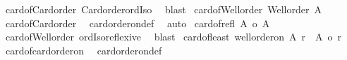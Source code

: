 \begin{isabellebody}
%
\isadelimproof
%
\endisadelimproof
%
\isatagproof
{}\isamarkupfalse%
\ card{\isacharunderscore}{\kern0pt}of{\isacharunderscore}{\kern0pt}Card{\isacharunderscore}{\kern0pt}order\ Card{\isacharunderscore}{\kern0pt}order{\isacharunderscore}{\kern0pt}ordIso\ \isamarkupfalse%
\ blast%
\endisatagproof
{\isafoldproof}%
%
\isadelimproof
\isanewline
%
\endisadelimproof
\isanewline
{}\isamarkupfalse%
\ card{\isacharunderscore}{\kern0pt}of{\isacharunderscore}{\kern0pt}Well{\isacharunderscore}{\kern0pt}order{\isacharcolon}{\kern0pt}\ {\isachardoublequoteopen}Well{\isacharunderscore}{\kern0pt}order\ {\isacharbar}{\kern0pt}A{\isacharbar}{\kern0pt}{\isachardoublequoteclose}\isanewline
%
\isadelimproof
%
\endisadelimproof
%
\isatagproof
{}\isamarkupfalse%
\ card{\isacharunderscore}{\kern0pt}of{\isacharunderscore}{\kern0pt}Card{\isacharunderscore}{\kern0pt}order\ \isamarkupfalse%
\ card{\isacharunderscore}{\kern0pt}order{\isacharunderscore}{\kern0pt}on{\isacharunderscore}{\kern0pt}def\ \isamarkupfalse%
\ auto%
\endisatagproof
{\isafoldproof}%
%
\isadelimproof
\isanewline
%
\endisadelimproof
\isanewline
{}\isamarkupfalse%
\ card{\isacharunderscore}{\kern0pt}of{\isacharunderscore}{\kern0pt}refl{\isacharcolon}{\kern0pt}\ {\isachardoublequoteopen}{\isacharbar}{\kern0pt}A{\isacharbar}{\kern0pt}\ {\isacharequal}{\kern0pt}o\ {\isacharbar}{\kern0pt}A{\isacharbar}{\kern0pt}{\isachardoublequoteclose}\isanewline
%
\isadelimproof
%
\endisadelimproof
%
\isatagproof
{}\isamarkupfalse%
\ card{\isacharunderscore}{\kern0pt}of{\isacharunderscore}{\kern0pt}Well{\isacharunderscore}{\kern0pt}order\ ordIso{\isacharunderscore}{\kern0pt}reflexive\ \isamarkupfalse%
\ blast%
\endisatagproof
{\isafoldproof}%
%
\isadelimproof
\isanewline
%
\endisadelimproof
\isanewline
{}\isamarkupfalse%
\ card{\isacharunderscore}{\kern0pt}of{\isacharunderscore}{\kern0pt}least{\isacharcolon}{\kern0pt}\ {\isachardoublequoteopen}well{\isacharunderscore}{\kern0pt}order{\isacharunderscore}{\kern0pt}on\ A\ r\ {\isasymLongrightarrow}\ {\isacharbar}{\kern0pt}A{\isacharbar}{\kern0pt}\ {\isasymle}o\ r{\isachardoublequoteclose}\isanewline
%
\isadelimproof
%
\endisadelimproof
%
\isatagproof
{}\isamarkupfalse%
\ card{\isacharunderscore}{\kern0pt}of{\isacharunderscore}{\kern0pt}card{\isacharunderscore}{\kern0pt}order{\isacharunderscore}{\kern0pt}on\ \isamarkupfalse%
\ card{\isacharunderscore}{\kern0pt}order{\isacharunderscore}{\kern0pt}on{\isacharunderscore}{\kern0pt}def\ \isamarkupfalse%

\end{isabellebody}

